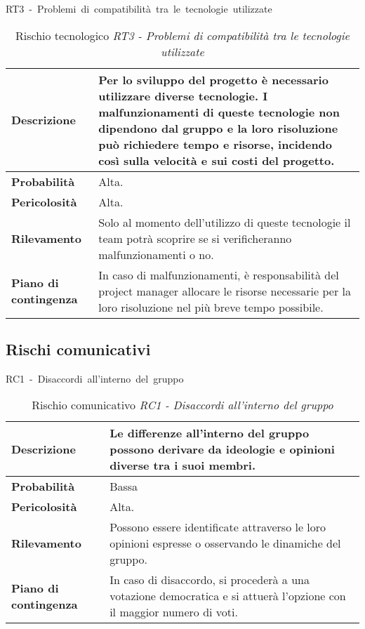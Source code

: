 \begin{table}[!h]
    \centering
    \hbox{RT3 - Problemi di compatibilità tra le tecnologie utilizzate}
    \vspace{0.3cm}
	\begin{tabular}{|l|p{10cm}|} 
		\hline
		\textbf{Descrizione} & Per lo sviluppo del progetto è necessario utilizzare diverse tecnologie. I malfunzionamenti di queste tecnologie non dipendono dal gruppo e la loro risoluzione può richiedere tempo e risorse, incidendo così sulla velocità e sui costi del progetto. 
        \\ 
        \hline
        \textbf{Probabilità} & Alta. \\
        \hline
        \textbf{Pericolosità} & Alta. \\
        \hline
        \textbf{Rilevamento} & Solo al momento dell'utilizzo di queste tecnologie il team potrà scoprire se si verificheranno malfunzionamenti o no.  \\
        \hline
        \textbf{Piano di contingenza} & In caso di malfunzionamenti, è responsabilità del project manager allocare le risorse necessarie per la loro risoluzione nel più breve tempo possibile.\\
		\hline
	\end{tabular}
    \caption{Rischio tecnologico \textit{RT3 - Problemi di compatibilità tra le tecnologie utilizzate}}
    \label{table:7}

\end{table}



\begin{table}[!h]
    \subsection{Rischi comunicativi}
    \centering
    \hbox{RC1 - Disaccordi all'interno del gruppo }
    \vspace{0.3cm}
	\begin{tabular}{|l|p{10cm}|} 
		\hline
		\textbf{Descrizione} & Le differenze all'interno del gruppo possono derivare da ideologie e opinioni diverse tra i suoi membri. \\ 
        \hline
        \textbf{Probabilità} & Bassa \\
        \hline
        \textbf{Pericolosità} & Alta. \\
        \hline
        \textbf{Rilevamento} & Possono essere identificate attraverso le loro opinioni espresse o osservando le dinamiche del gruppo. \\
        \hline
        \textbf{Piano di contingenza} & In caso di disaccordo, si procederà a una votazione democratica e si attuerà l'opzione con il maggior numero di voti. \\
		\hline
	\end{tabular}
    \caption{Rischio comunicativo \textit{RC1 - Disaccordi all'interno del gruppo}}
    \label{table:8}
\end{table}

